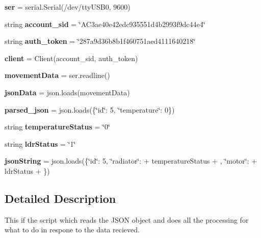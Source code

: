 \begin{DoxyCompactItemize}
\item 
\mbox{\label{namespaceread_json_a594219c9f593b7b3258a4aee280fb15b}} 
{\bfseries ser} = serial.\+Serial(\textquotesingle{}/dev/tty\+U\+S\+B0\textquotesingle{}, 9600)
\item 
\mbox{\label{namespaceread_json_a9f1b4476eb22ee8d3cf0fbe3a8be4708}} 
string {\bfseries account\+\_\+sid} = \char`\"{}A\+C3ae40e42edc935551d4b2993f9dc44e4\char`\"{}
\item 
\mbox{\label{namespaceread_json_af36117cdb1b6ef934315fab1c5db6e42}} 
string {\bfseries auth\+\_\+token} = \char`\"{}287a9d36b8b1f460751aed4111640218\char`\"{}
\item 
\mbox{\label{namespaceread_json_abb8f5e6e9f12e22ef89a796fe494c4f5}} 
{\bfseries client} = Client(account\+\_\+sid, auth\+\_\+token)
\item 
\mbox{\label{namespaceread_json_ab5d207a9f7d14f8001b445b21d30c3ae}} 
{\bfseries movement\+Data} = ser.\+readline()
\item 
\mbox{\label{namespaceread_json_a4b426e3f17d88e444af26fd1acb88606}} 
{\bfseries json\+Data} = json.\+loads(movement\+Data)
\item 
\mbox{\label{namespaceread_json_a0d05b798c6667129dd9f20321ac02201}} 
{\bfseries parsed\+\_\+json} = json.\+loads(\textquotesingle{}\{\char`\"{}id\char`\"{}\+: 5, \char`\"{}temperature\char`\"{}\+: 0\}\textquotesingle{})
\item 
\mbox{\label{namespaceread_json_ad5965100249e3573f380d725022d2c26}} 
string {\bfseries temperature\+Status} = \char`\"{}0\char`\"{}
\item 
\mbox{\label{namespaceread_json_af58e519e44a9097e6acf5244711af8d2}} 
string {\bfseries ldr\+Status} = \char`\"{}1\char`\"{}
\item 
\mbox{\label{namespaceread_json_aea9ea4d040020fdf2e394d9bf6ca717c}} 
{\bfseries json\+String} = json.\+loads(\textquotesingle{}\{\char`\"{}id\char`\"{}\+: 5, \char`\"{}radiator\char`\"{}\+: \textquotesingle{} + temperature\+Status + \textquotesingle{}, \char`\"{}motor\char`\"{}\+: \textquotesingle{} + ldr\+Status + \textquotesingle{}\}\textquotesingle{})
\end{DoxyCompactItemize}


\subsection{Detailed Description}
\begin{DoxyVerb}This if the script which reads the JSON object and does all the
processing for what to do in respone to the data recieved.
\end{DoxyVerb}
 
